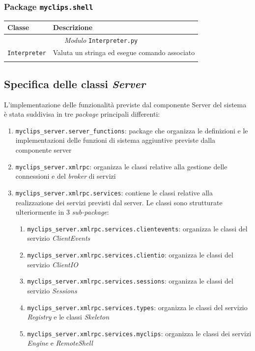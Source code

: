 \subsubsection{Package \texttt{myclips.shell}}

\begin{longtable}{p{5.5cm}p{6.5cm}}
\hline 
\textbf{Classe} & \textbf{Descrizione} \\ 
\hline\hline 
\endhead

\multicolumn{2}{c}{\emph{Modulo} \texttt{Interpreter.py}}\\
	\hdashline[5pt/5pt]
		\texttt{Interpreter} & Valuta un stringa ed esegue comando associato \\ 
	\hline\\

\end{longtable}

\clearpage

\subsection{Specifica delle classi \emph{Server}}

L'implementazione delle funzionalità previste dal componente Server del sistema è stata suddivisa in tre \emph{package} principali differenti:

\begin{enumerate}
	\item \texttt{myclips\_server.server\_functions}: package che organizza le definizioni e le implementazioni delle funzioni di sistema aggiuntive previste dalla componente server
	\item \texttt{myclips\_server.xmlrpc}: organizza le classi relative alla gestione delle connessioni e del \emph{broker} di servizi
	\item \texttt{myclips\_server.xmlrpc.services}: contiene le classi relative alla realizzazione dei servizi previsti dal server. Le classi sono strutturate ulteriormente in 3 \emph{sub-package}:
		\begin{enumerate}
			\item \texttt{myclips\_server.xmlrpc.services.clientevents}: organizza le classi del servizio \emph{ClientEvents}
			\item \texttt{myclips\_server.xmlrpc.services.clientio}: organizza le classi del servizio \emph{ClientIO}
			\item \texttt{myclips\_server.xmlrpc.services.sessions}: organizza le classi del servizio \emph{Sessions}
			\item \texttt{myclips\_server.xmlrpc.services.types}: organizza le classi del servizio \emph{Registry} e le classi \emph{Skeleton}
			\item \texttt{myclips\_server.xmlrpc.services.myclips}: organizza le classi dei servizi \emph{Engine} e \emph{RemoteShell}
		\end{enumerate}
\end{enumerate}

